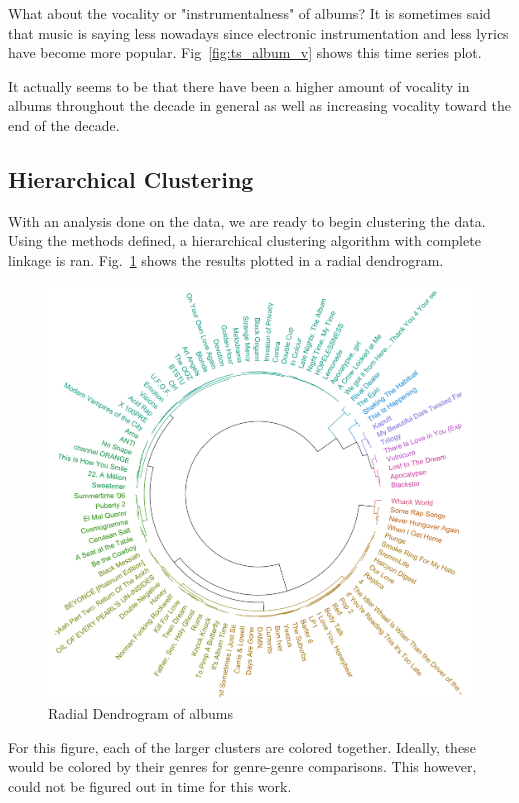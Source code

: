 \documentclass[conference]{IEEEtran}
\begin{document}
What about the vocality or "instrumentalness" of albums? It is sometimes said that music is saying less nowadays since electronic instrumentation and less lyrics have become more popular. Fig~\ref{fig:ts_album_v} shows this time series plot. 

It actually seems to be that there have been a higher amount of vocality in albums throughout the decade in general as well as increasing vocality toward the end of the decade. 

\subsection{Hierarchical Clustering}

With an analysis done on the data, we are ready to begin clustering the data. Using the methods defined, a hierarchical clustering algorithm with complete linkage is ran. Fig.~\ref{fig:circlize} shows the results plotted in a radial dendrogram.

\begin{figure}[htbp]
\centerline{\includegraphics[width = \columnwidth]{spotify-images/circlize}}
\caption{Radial Dendrogram of albums}
\label{fig:circlize}
\end{figure}

For this figure, each of the larger clusters are colored together. Ideally, these would be colored by their genres for genre-genre comparisons. This however, could not be figured out in time for this work.
\end{document}
